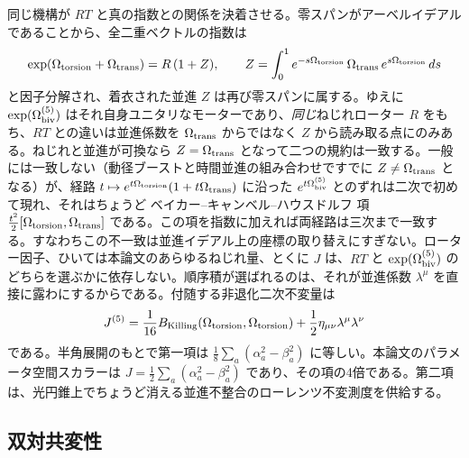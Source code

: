 \documentclass[a4paper]{article}
\theoremstyle{definition}
\theoremstyle{remark}
\begin{document}
同じ機構が \( RT \) と真の指数との関係を決着させる。零スパンがアーベルイデアルであることから、全二重ベクトルの指数は
\[
\exp(\Omega_{\rm torsion}+\Omega_{\rm trans}) = R\,(1+Z), \qquad Z = \int_0^1 e^{-s\Omega_{\rm torsion}}\,\Omega_{\rm trans}\,e^{s\Omega_{\rm torsion}}\,ds
\]
と因子分解され、着衣された並進 \( Z \) は再び零スパンに属する。ゆえに \( \exp(\Omega_{\rm biv}^{(5)}) \) はそれ自身ユニタリなモーターであり、\emph{同じ}ねじれローター \( R \) をもち、\( RT \) との違いは並進係数を \( \Omega_{\rm trans} \) からではなく \( Z \) から読み取る点にのみある。ねじれと並進が可換なら \( Z=\Omega_{\rm trans} \) となって二つの規約は一致する。一般には一致しない（動径ブーストと時間並進の組み合わせですでに \( Z\neq\Omega_{\rm trans} \) となる）が、経路 \( t\mapsto e^{t\Omega_{\rm torsion}}(1+t\Omega_{\rm trans}) \) に沿った \( e^{t\Omega_{\rm biv}^{(5)}} \) とのずれは二次で初めて現れ、それはちょうど ベイカー–キャンベル–ハウスドルフ 項 \( \tfrac{t^2}{2}[\Omega_{\rm torsion},\Omega_{\rm trans}] \) である。この項を指数に加えれば両経路は三次まで一致する。すなわちこの不一致は並進イデアル上の座標の取り替えにすぎない。ローター因子、ひいては本論文のあらゆるねじれ量、とくに \( J \) は、\( RT \) と \( \exp(\Omega_{\rm biv}^{(5)}) \) のどちらを選ぶかに依存しない。順序積が選ばれるのは、それが並進係数 \( \lambda^\mu \) を直接に露わにするからである。付随する非退化二次不変量は
\[
J^{(5)} = \frac{1}{16} B_{\rm Killing}(\Omega_{\rm torsion}, \Omega_{\rm torsion}) + \frac{1}{2} \eta_{\mu\nu} \lambda^\mu \lambda^\nu
\]
である。半角展開のもとで第一項は \(\frac18\sum_a(\alpha_a^2-\beta_a^2)\) に等しい。本論文のパラメータ空間スカラーは \( J=\frac12\sum_a(\alpha_a^2-\beta_a^2) \) であり、その項の4倍である。第二項は、光円錐上でちょうど消える並進不整合のローレンツ不変測度を供給する。

\subsection{双対共変性}
\end{document}
